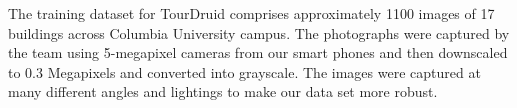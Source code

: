 The training dataset for TourDruid comprises approximately 1100 images of 17 buildings across Columbia University campus. The photographs were captured by the team using 5-megapixel cameras from our smart phones and then downscaled to 0.3 Megapixels and converted into grayscale. The images were captured at many different angles and lightings to make our data set more robust.